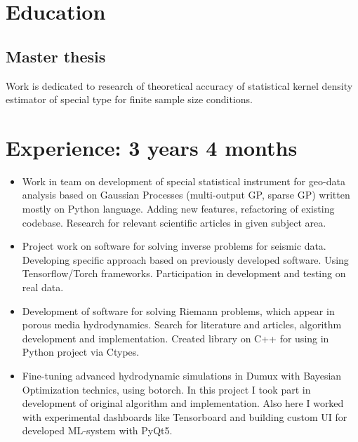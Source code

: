 \documentclass[12pt,a4paper]{moderncv}
\begin{document}
\makecvtitle
\section{Education}

\subsection{Master thesis}
Work is dedicated to research of theoretical accuracy of statistical kernel density estimator of special type for finite sample size conditions.

\section{Experience: 3 years 4 months}
\begin{itemize}
\item Work in team on development of special statistical instrument for geo-data analysis based on Gaussian Processes (multi-output GP, sparse GP) written mostly on Python language. Adding new features, refactoring of existing codebase. Research for relevant scientific articles in given subject area.\newline
\item Project work on software for solving inverse problems for seismic data. Developing specific approach based on previously developed software.
Using Tensorflow/Torch frameworks. Participation in development and testing on real data. \newline
\item Development of software for solving Riemann problems, which appear in porous media hydrodynamics.
Search for literature and articles, algorithm development and implementation. Created library on C++ for using in Python project via Ctypes. \newline
\item Fine-tuning advanced hydrodynamic simulations in Dumux with Bayesian Optimization technics, using botorch. In this project I took part in development of original algorithm and implementation. Also here I worked with experimental dashboards like Tensorboard and building custom UI for developed ML-system with PyQt5.
\end{itemize}
\end{document}
